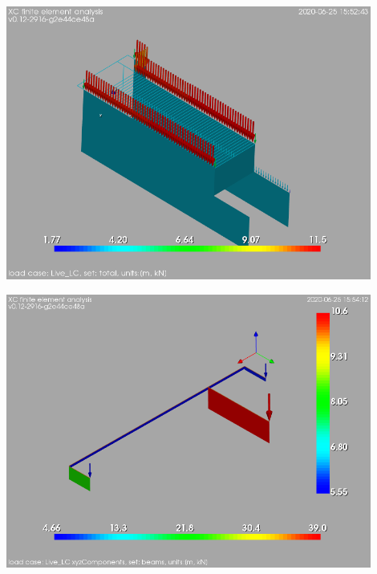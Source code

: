 \begin{Figure}
    \includegraphics[width=120mm]{ramp_wall/figures/live_load_over_ramp_wall}
\end{Figure}

\begin{Figure}
    \centering
    \includegraphics[width=120mm]{ramp_wall/figures/live_load_over_steel_beams}
\end{Figure}

